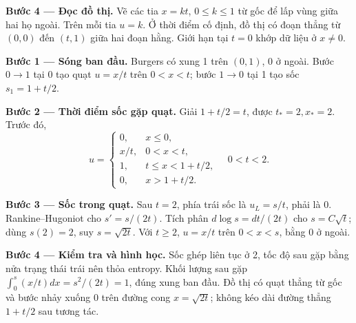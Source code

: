 \textbf{Bước 4 — Đọc đồ thị.} Vẽ các tia $x=kt$, $0\le k\le1$ từ gốc để lấp vùng giữa hai họ ngoài. Trên mỗi tia $u=k$. Ở thời điểm cố định, đồ thị có đoạn thẳng từ $(0,0)$ đến $(t,1)$ giữa hai đoạn hằng. Giới hạn tại $t=0$ khớp dữ liệu ở $x\ne0$.

\textbf{Bước 1 — Sóng ban đầu.} Burgers có xung 1 trên $(0,1)$, 0 ở ngoài. Bước $0\to1$ tại 0 tạo quạt $u=x/t$ trên $0<x<t$; bước $1\to0$ tại 1 tạo sốc $s_1=1+t/2$.

\textbf{Bước 2 — Thời điểm sốc gặp quạt.} Giải $1+t/2=t$, được $t_*=2,x_*=2$. Trước đó,
\[u=\begin{cases}0,&x\le0,\\x/t,&0<x<t,\\1,&t\le x<1+t/2,\\0,&x>1+t/2.\end{cases}\quad0<t<2.\]

\textbf{Bước 3 — Sốc trong quạt.} Sau $t=2$, phía trái sốc là $u_L=s/t$, phải là 0. Rankine–Hugoniot cho $s'=s/(2t)$. Tích phân $d\log s=dt/(2t)$ cho $s=C\sqrt t$; dùng $s(2)=2$, suy $s=\sqrt{2t}$. Với $t\ge2$, $u=x/t$ trên $0<x<s$, bằng 0 ở ngoài.

\textbf{Bước 4 — Kiểm tra và hình học.} Sốc ghép liên tục ở 2, tốc độ sau gặp bằng nửa trạng thái trái nên thỏa entropy. Khối lượng sau gặp $\int_0^s(x/t)dx=s^2/(2t)=1$, đúng xung ban đầu. Đồ thị có quạt thẳng từ gốc và bước nhảy xuống 0 trên đường cong $x=\sqrt{2t}$; không kéo dài đường thẳng $1+t/2$ sau tương tác.
